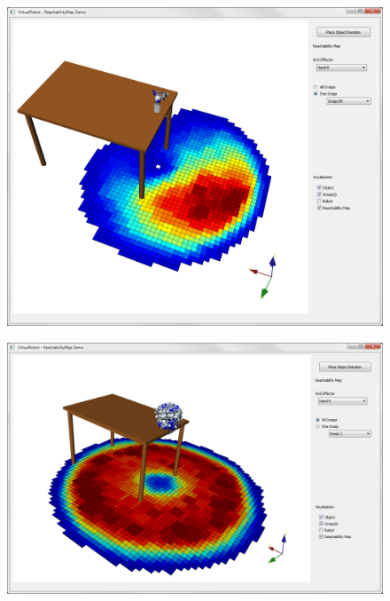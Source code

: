 \documentclass{book}
\begin{document}
\begin{itemize}
\begin{figure}[H]
\begin{minipage} {.45\linewidth}
	  \includegraphics[width=\linewidth]{Reachmap}
	\end{minipage}
\end{figure}
\begin{figure}[H]
	\centering
	\begin{minipage} {.45\linewidth}
	  \includegraphics[width=\linewidth]{ReachMapAll}
	\end{minipage}
\end{figure}
\end{itemize}
\end{document}
